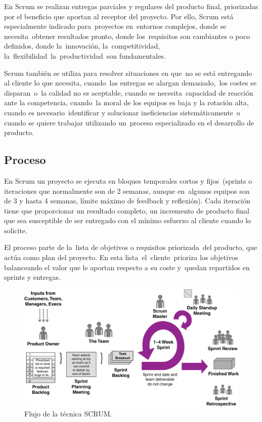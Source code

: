 En Scrum se realizan entregas parciales y regulares del producto final, priorizadas por el beneficio que aportan al receptor del proyecto. Por ello, Scrum está especialmente indicado para proyectos en entornos complejos, donde se necesita obtener resultados pronto, donde los requisitos son cambiantes o poco definidos, donde la innovación, la competitividad, la flexibilidad la productividad son fundamentales.

Scrum también se utiliza para resolver situaciones en que no se está entregando al cliente lo que necesita, cuando las entregas se alargan demasiado, los costes se disparan o la calidad no es aceptable, cuando se necesita capacidad de reacción ante la competencia, cuando la moral de los equipos es baja y la rotación alta, cuando es necesario identificar y solucionar ineficiencias sistemáticamente o cuando se quiere trabajar utilizando un proceso especializado en el desarrollo de producto. 

\subsection{Proceso}
En Scrum un proyecto se ejecuta en bloques temporales cortos y fijos (sprints o iteraciones que normalmente son de 2 semanas, aunque en algunos equipos son de 3 y hasta 4 semanas, límite máximo de feedback y reflexión). Cada iteración tiene que proporcionar un resultado completo, un incremento de producto final que sea susceptible de ser entregado con el mínimo esfuerzo al cliente cuando lo solicite.

El proceso parte de la lista de objetivos o requisitos priorizada del producto, que actúa como plan del proyecto. En esta lista el cliente prioriza los objetivos balanceando el valor que le aportan respecto a su coste y quedan repartidos en sprints y entregas.

\begin{figure}[H]
\centering
\includegraphics[width=125mm,scale=1]{Figuras/flujo_scrum}
\caption{Flujo de la técnica SCRUM.}
  \label{flujo_scrum}
\end{figure}

